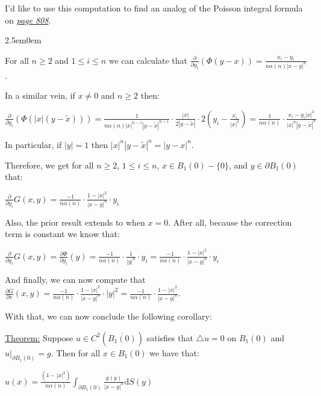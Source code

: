 \documentclass{book}
\newcommand{\inLinkRap}[2]{{\color{blue}\hyperlink{#1}{\textit{#2}}}}
\newcommand{\hTwo}{%
\color{Black}%
   \fontsize{13}{15}\selectfont%
}
\newcommand{\pracTwo}{
   \color{Orange}%
   \fontsize{12}{14}\selectfont%
}
\newcommand{\exTwo}{%
   \color{Purple}%
   \fontsize{13}{15}\selectfont%
}
\newenvironment{myIndent}{%
   \begin{adjustwidth}{2.5em}{0em}%
}{%
   \end{adjustwidth}%
}
\newcommand{\df}{\mathrm{d}}
\newcommand{\retTwo}{\hfill\bigbreak}
\begin{document}
\hTwo I'd like to use this computation to find an analog of the Poisson integral formula on \inLinkRap{Math 220c Poisson Integral Formula}{page 808}.\\ [-8pt]
\begin{myIndent}\pracTwo
	For all $n \geq 2$ and $1 \leq i \leq n$ we can calculate that $\frac{\partial}{\partial y_i}\left(\Phi(y - x)\right) = \frac{x_i - y_i}{n\alpha(n)|x - y|^n}$.\retTwo

	In a similar vein, if $x \neq 0$ and $n \geq 2$ then:
	
	{\centering$\frac{\partial}{\partial y_i}\left(\Phi(|x|(y - \widetilde{x}))\right) = \frac{1}{n\alpha(n)|x|^{n-1}|y - \widetilde{x}|^{n-1}} \cdot \frac{|x|}{2|y - \widetilde{x}|} \cdot 2(y_i - \frac{x_i}{|x|^2}) = \frac{1}{n\alpha(n)} \cdot \frac{x_i - y_i|x|^2}{|x|^n |y - \widetilde{x}|^n}$\retTwo\par}

	In particular, if $|y| = 1$ then $|x|^n |y - \widetilde{x}|^n = |y - x|^n$.\retTwo

	Therefore, we get for all $n \geq 2$, $1 \leq i \leq n$, $x \in B_1(0) - \{0\}$, and $y \in \partial B_1(0)$ that:

	{\centering$\frac{\partial}{\partial y_i}G(x, y) = \frac{-1}{n\alpha(n)} \cdot \frac{1 - |x|^2}{|x - y|^n} \cdot y_i$\retTwo\par}

	Also, the prior result extends to when $x = 0$. After all,  because the correction term is constant we know that:

	{\centering$\frac{\partial}{\partial y_i}G(x, y) = \frac{\partial \Phi}{\partial y_i}(y) = \frac{-1}{n\alpha(n)} \cdot \frac{1}{|y|^n} \cdot y_i = \frac{-1}{n\alpha(n)} \cdot \frac{1 - |x|^2}{|x - y|^n} \cdot y_i$\retTwo\par}

	And finally, we can now compute that $\frac{\partial G}{\partial v}(x, y) = \frac{-1}{n\alpha(n)} \cdot \frac{1 - |x|^2}{|x - y|^n} \cdot |y|^2 = \frac{-1}{n\alpha(n)} \cdot \frac{1 - |x|^2}{|x - y|^n}$.\retTwo

	With that, we can now conclude the following corollary:\retTwo
\end{myIndent}

\exTwo\ul{Theorem:} Suppose $u \in C^2(\overline{B_1(0)})$ satisfies that $\triangle u = 0$ on $B_1(0)$ and $u|_{\partial B_1(0)} = g$. Then for all $x \in B_1(0)$ we have that:

{\centering $u(x) = \frac{(1 - |x|^2)}{n\alpha(n)}\int_{\partial B_1(0)} \frac{g(y)}{|x - y|^n} \df S(y)$ \retTwo\par}
\end{document}
